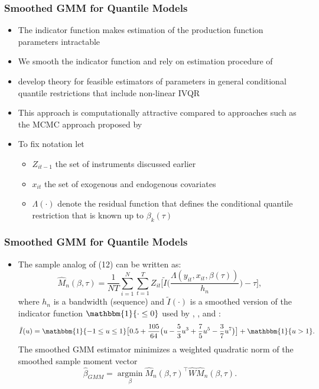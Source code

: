 \documentclass{beamer}
\begin{document}
\begin{frame}
\frametitle{Smoothed GMM for Quantile Models}
\begin{itemize}
	\item The indicator function makes estimation of the production function parameters intractable
	\item We smooth the indicator function and rely on estimation procedure of \textcite{Kaplan2016}
	\item \textcite{qgmm} develop theory for feasible estimators of parameters in general conditional quantile restrictions that include non-linear IVQR
	\item This approach is computationally attractive compared to approaches such as the MCMC approach proposed by \textcite{Chernozhukov2003}
	\item To fix notation let
	\begin{itemize}
		\item $Z_{it-1}$ the set of instruments discussed earlier
		\item $x_{it}$ the set of exogenous and endogenous covariates
		\item $\Lambda(\cdot)$ denote the residual function that defines the conditional quantile restriction that is known up to $\beta_{k}(\tau)$
	\end{itemize}
	
\end{itemize}
\end{frame}

\begin{frame}
\frametitle{Smoothed GMM for Quantile Models}
\begin{itemize}
	\item The sample analog of (12) can be written as:
	\begin{equation}
    \hat{M}_{n}(\beta, \tau)=\frac{1}{NT}\sum_{i=1}^{N}\sum_{t=1}^{T}Z_{it}\Bigg[\tilde{I}\Bigg(\frac{\Lambda(y_{it}, x_{it}, \beta(\tau))}{h_{n}}\Bigg)-\tau\Bigg],
	\end{equation}
	where $h_{n}$ is a bandwidth (sequence) and $\tilde{I}(\cdot)$ is a smoothed version of the indicator function $\mathbbm{1}\{\cdot \leq 0\}$ used by \textcite{Horowitz1998}, \textcite{Whang2006}, and \textcite{Kaplan2016}:
	\begin{equation}
	    \tilde{I}(u)=\mathbbm{1}\{-1\leq u \leq 1\}\big[0.5+\frac{105}{64}\big(u-\frac{5}{3}u^{3}+\frac{7}{5}u^{5}- \frac{3}{7}u^{7}\big)\big]+\mathbbm{1}\{u>1\}.
	\end{equation}
	The smoothed GMM estimator minimizes a weighted quadratic norm of the smoothed sample moment vector
	\begin{equation}
		\hat{\beta}_{GMM}=\underset{\beta}{\operatorname{argmin}}\hat{M}_{n}(\beta, \tau)^{\top}\hat{W}\hat{M}_{n}(\beta, \tau).
		\end{equation}
\end{itemize}
\end{frame}
\end{document}
